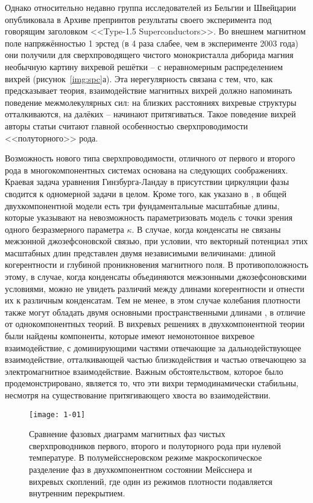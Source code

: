 Однако относительно недавно группа исследователей из Бельгии и Швейцарии 
опубликовала в Архиве препринтов результаты своего эксперимента под говорящим 
заголовком <<Type-1.5 Superconductors>>. Во внешнем магнитном поле 
напряжённостью 1 эрстед (в 4 раза слабее, чем в эксперименте 2003 года) они 
получили для сверхпроводящего чистого монокристалла диборида магния необычную 
картину вихревой решётки -- с неравномерным распределением вихрей 
(рисунок~\ref{img:spc}а). Эта нерегулярность связана с тем, что, как 
предсказывает теория, взаимодействие магнитных вихрей должно напоминать 
поведение межмолекулярных сил: на близких расстояниях вихревые структуры 
отталкиваются, на далёких -- начинают притягиваться. Такое поведение вихрей 
авторы статьи считают главной особенностью сверхпроводимости <<полуторного>> 
рода. \cite{bib:superconductors}

Возможность нового типа сверхпроводимости, отличного от первого и второго рода 
в многокомпонентных системах \cite{bib:1,bib:2} основана на следующих 
соображениях. Краевая задача уравнения Гинзбурга-Ландау в присутствии 
циркуляции фазы сводится к одномерной задачи в целом. Кроме того, как указано в 
\cite{bib:1,bib:2}, в общей двухкомпонентной модели есть три фундаментальные 
масштабные длины, которые указывают на невозможность параметризовать модель с 
точки зрения одного безразмерного параметра \( \kappa \). В случае, когда 
конденсаты не связаны межзонной джозефсоновской связью, при условии, что 
векторный потенциал этих масштабных длин представлен двумя независимыми 
величинами: длиной когерентности и глубиной проникновения магнитного поля. В 
противоположность этому, в случае, когда конденсаты объединяются межзонными 
джозефсоновскими условиями, можно не увидеть различий между длинами 
когерентности и отнести их к различным конденсатам. Тем не менее, в этом 
случае колебания плотности также могут обладать двумя основными 
пространственными длинами \cite{bib:2}, в отличие от однокомпонентных теорий. 
В \cite{bib:1,bib:2} вихревых решениях в двухкомпонентной теории были найдены 
компоненты, которые имеют немонотонное вихревое взаимодействие, с 
доминирующими частями отвечающие за дальнодействующее взаимодействие, 
отталкивающей частью близкодействия и частью отвечающею за электромагнитное 
взаимодействие. Важным обстоятельством, которое было продемонстрировано, 
является то, что эти вихри термодинамически стабильны, несмотря на 
существование притягивающего хвоста во взаимодействии.

\begin{figure}[h!]
    \center
    \texttt{[image: 1-01]}
    \caption{Сравнение фазовых диаграмм магнитных фаз чистых сверхпроводников
        первого, второго и полуторного рода при нулевой температуре. В 
        полумейсснеровском режиме макроскопическое разделение фаз в 
        двухкомпонентном состоянии Мейсснера и вихревых скоплений, где 
        один из режимов плотности подавляется внутренним перекрытием.}
    \label{fig:1}
\end{figure}

